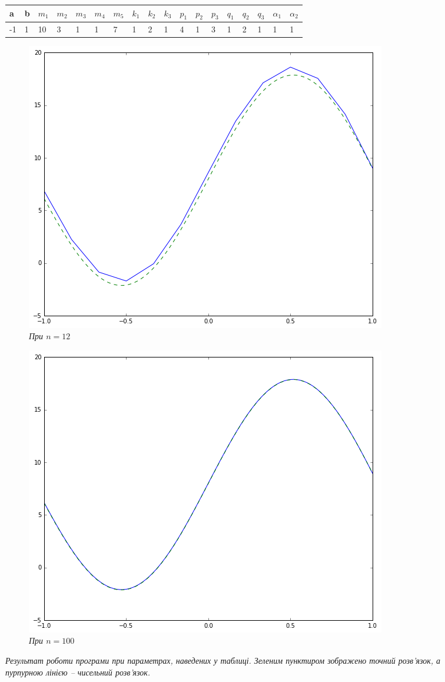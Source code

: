 \begin{figure}
\begin{center}
    \begin{tabular}{| l | l | l | l | l | l | l | l | l | l | l | l | l | l | l | l | l | l |}
	\hline
	a & b & $m_1$ & $m_2$ & $m_3$ & $m_4$ & $m_5$ & $k_1$ & $k_2$ & $k_3$ & $p_1$ & $p_2$ & $p_3$ & $q_1$ & $q_2$ & $q_3$ & $\alpha_1$ & $\alpha_2$ \\\hline
	-1 & 1 & 10 & 3 & 1 & 1 & 7 & 1 & 2 & 1 & 4 & 1 & 3 & 1 & 2 & 1 & 1 & 1\\ \hline
    \end{tabular}
\end{center}
\bigskip
\centering
\begin{subfigure}{.44\textwidth}
  \centering
  \includegraphics[width=.9\linewidth]{res1_n12}
  \caption{\it При \(n = 12\)}
  \label{fig:sub1}
\end{subfigure}%
\begin{subfigure}{.44\textwidth}
  \centering
  \includegraphics[width=.9\linewidth]{res1_n100}
  \caption{\it При \(n = 100\)}
  \label{fig:sub2}
\end{subfigure}
\caption{\it Результат роботи програми \cite{SourceCode} при параметрах, наведених у таблиці. Зеленим пунктиром зображено точний розв'язок, а пурпурною лінією -- чисельний розв'язок.}
\label{fig:res1}
\end{figure}


